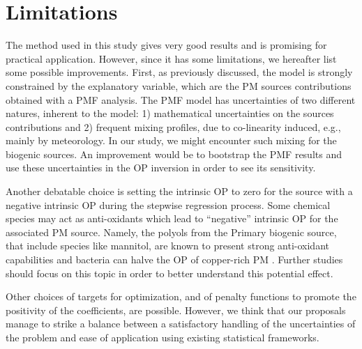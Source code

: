 \documentclass[acp, manuscript]{copernicus}
\begin{document}
\section{Limitations}\label{limitations}

The method used in this study gives very good results and is promising for
practical application. However, since it has some limitations, we hereafter list
some possible improvements. First, as previously discussed, the model is
strongly constrained by the explanatory variable, which are the PM sources
contributions obtained with a PMF analysis. The PMF model has uncertainties of
two different natures, inherent to the model: 1) mathematical uncertainties on
the sources contributions and 2) frequent mixing profiles, due to co-linearity
induced, e.g., mainly by meteorology. In our study, we might encounter such
mixing for the biogenic sources. An improvement would be to bootstrap the PMF
results and use these uncertainties in the OP inversion in order to see its
sensitivity.

Another debatable choice is setting the intrinsic OP to zero for the source with
a negative intrinsic OP during the stepwise regression process. Some chemical
species may act as anti-oxidants which lead to ``negative'' intrinsic OP for the
associated PM source. Namely, the polyols from the Primary biogenic source, that
include species like mannitol, are known to present strong anti-oxidant
capabilities \citep{liu_therapeutic_2010} and bacteria can halve the OP of
copper-rich PM \citep{samake_unexpected_2017}. Further studies should focus on
this topic in order to better understand this potential effect.

Other choices of targets for optimization, and of penalty functions to promote
the positivity of the coefficients, are possible. However, we think that our
proposals manage to strike a balance between a satisfactory handling of the
uncertainties of the problem and ease of application using existing statistical
frameworks.


\conclusions  %
\end{document}
